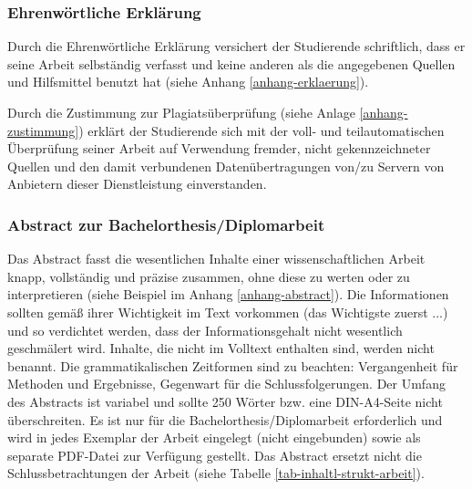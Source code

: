 \subsubsection{Ehrenwörtliche Erklärung}
\label{formal-gestaltung-anhaenge-erklaerung}
Durch die Ehrenwörtliche Erklärung versichert der Studierende schriftlich, dass er seine Arbeit selbständig verfasst und keine anderen als die angegebenen Quellen und Hilfsmittel benutzt hat (siehe Anhang \ref{anhang-erklaerung}).

Durch die Zustimmung zur Plagiatsüberprüfung (siehe Anlage \ref{anhang-zustimmung}) erklärt der Studierende sich mit der voll- und teilautomatischen Überprüfung seiner Arbeit auf Verwendung fremder, nicht gekennzeichneter Quellen und den damit verbundenen Datenübertragungen von/zu Servern von Anbietern dieser Dienstleistung einverstanden.

\subsubsection{Abstract zur Bachelorthesis/Diplomarbeit}
\label{formal-gestaltung-anhaenge-abstract}
Das Abstract fasst die wesentlichen Inhalte einer wissenschaftlichen Arbeit knapp, vollständig und präzise zusammen, ohne diese zu werten oder zu interpretieren (siehe Beispiel im Anhang \ref{anhang-abstract}).
Die Informationen sollten gemäß ihrer Wichtigkeit im Text vorkommen (das Wichtigste zuerst ...) und so verdichtet werden, dass der Informationsgehalt nicht wesentlich geschmälert wird.
Inhalte, die nicht im Volltext enthalten sind, werden nicht benannt.
Die grammatikalischen Zeitformen sind zu beachten: Vergangenheit für Methoden und Ergebnisse, Gegenwart für die Schlussfolgerungen.
Der Umfang des Abstracts ist variabel und sollte 250 Wörter bzw. eine DIN-A4-Seite nicht überschreiten.
Es ist nur für die Bachelorthesis/Diplomarbeit erforderlich und wird in jedes Exemplar der Arbeit eingelegt (nicht eingebunden) sowie als separate \ac{PDF}-Datei zur Verfügung gestellt. %
Das Abstract ersetzt nicht die Schlussbetrachtungen der Arbeit (siehe Tabelle \ref{tab-inhaltl-strukt-arbeit}).
